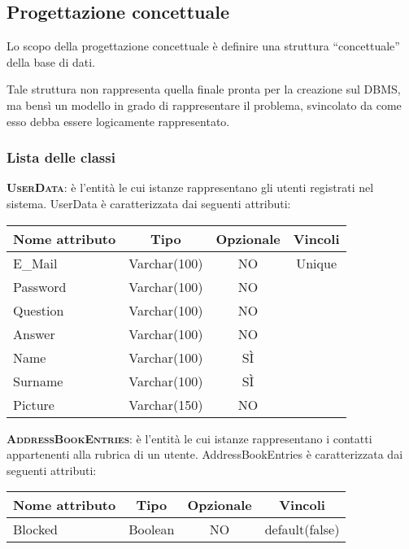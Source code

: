 \subsection{Progettazione concettuale}
Lo scopo della progettazione concettuale è definire una struttura ``concettuale'' della base di dati.

Tale struttura non rappresenta quella finale pronta per la creazione sul DBMS, ma bensì un modello in grado di rappresentare il problema, svincolato da come esso debba essere logicamente rappresentato.

\subsubsection{Lista delle classi}

\begin{description}
	\item{\scshape\bfseries UserData}: è l'entità le cui istanze rappresentano gli utenti registrati nel sistema. UserData è caratterizzata dai seguenti attributi:

\begin{center}
\begin{tabular}{lccc}
\toprule
Nome attributo & Tipo & Opzionale & Vincoli\\
\midrule
E\_Mail & Varchar(100) & NO & Unique\\
Password & Varchar(100) & NO &\\
Question & Varchar(100) & NO &\\
Answer & Varchar(100) & NO &\\
Name & Varchar(100) & SÌ &\\
Surname & Varchar(100) & SÌ &\\
Picture & Varchar(150) & NO &\\
\bottomrule
\end{tabular}
\end{center}

	\item{\scshape\bfseries AddressBookEntries}: è l'entità le cui istanze rappresentano i contatti appartenenti alla rubrica di un utente. AddressBookEntries è caratterizzata dai seguenti attributi:
	
\begin{center}
\begin{tabular}{lccc}
\toprule
Nome attributo & Tipo & Opzionale & Vincoli\\
\midrule
Blocked & Boolean & NO & default(false)\\
\bottomrule
\end{tabular}
\end{center}


\end{description}
